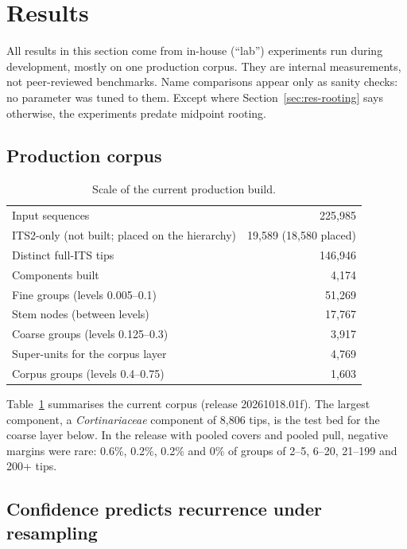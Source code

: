 \documentclass[11pt,a4paper]{article}
\begin{document}
\section{Results}\label{sec:results}

All results in this section come from in-house (``lab'') experiments run during development,
mostly on one production corpus. They are internal measurements, not peer-reviewed benchmarks.
Name comparisons appear only as sanity checks: no parameter was tuned to them. Except where
Section~\ref{sec:res-rooting} says otherwise, the experiments predate midpoint rooting.

\subsection{Production corpus}\label{sec:res-scale}

\begin{table}[t]
\centering\small
\caption{Scale of the current production build.}
\label{tab:scale}
\begin{tabular}{@{}lr@{}}
\toprule
Input sequences & 225,985 \\
\quad ITS2-only (not built; placed on the hierarchy) & 19,589 (18,580 placed) \\
Distinct full-ITS tips & 146,946 \\
Components built & 4,174 \\
Fine groups (levels 0.005--0.1) & 51,269 \\
Stem nodes (between levels) & 17,767 \\
Coarse groups (levels 0.125--0.3) & 3,917 \\
Super-units for the corpus layer & 4,769 \\
Corpus groups (levels 0.4--0.75) & 1,603 \\
\bottomrule
\end{tabular}
\end{table}

Table~\ref{tab:scale} summarises the current corpus (release 20261018.01f). The largest component, a
\emph{Cortinariaceae} component of 8,806 tips, is the test bed for the coarse layer below. In the
release with pooled covers and pooled pull, negative margins were rare: 0.6\%, 0.2\%, 0.2\% and 0\%
of groups of 2--5, 6--20, 21--199 and 200+ tips.

\subsection{Confidence predicts recurrence under resampling}\label{sec:res-confidence}
\end{document}
